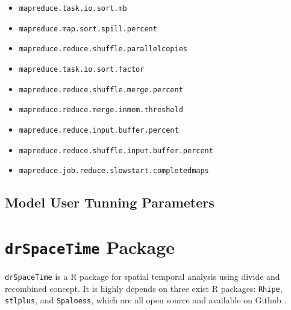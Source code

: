 \begin{itemize}
\item \texttt{mapreduce.task.io.sort.mb}

\item \texttt{mapreduce.map.sort.spill.percent}

\item \texttt{mapreduce.reduce.shuffle.parallelcopies}

\item \texttt{mapreduce.task.io.sort.factor}

\item \texttt{mapreduce.reduce.shuffle.merge.percent}

\item \texttt{mapreduce.reduce.merge.inmem.threshold}

\item \texttt{mapreduce.reduce.input.buffer.percent}

\item \texttt{mapreduce.reduce.shuffle.input.buffer.percent}

\item \texttt{mapreduce.job.reduce.slowstart.completedmaps}

\end{itemize}


\subsection{Model User Tunning Parameters}


\section{\texttt{drSpaceTime} Package}

\texttt{drSpaceTime} is a R package for spatial temporal analysis using divide 
and recombined concept. It is highly depends on three exist R packages: 
\texttt{Rhipe}, \texttt{stlplus}, and \texttt{Spaloess}, which are all open 
source and available on Github \cite{github}.